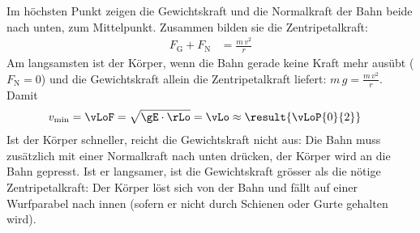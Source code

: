 \begin{center}
\end{center}

Im höchsten Punkt zeigen die Gewichtskraft und die Normalkraft der Bahn beide nach unten, zum Mittelpunkt. Zusammen bilden sie die Zentripetalkraft:
\begin{align}
 F_\mathrm{G} + F_\mathrm{N} &= \frac{m\,v^2}{r}
\end{align}
Am langsamsten ist der Körper, wenn die Bahn gerade keine Kraft mehr ausübt ($F_\mathrm{N} = 0$) und die Gewichtskraft allein die Zentripetalkraft liefert: $m\,g = \frac{m\,v^2}{r}$. Damit
\begin{align}
 v_\mathrm{min} &= \vLoF = \sqrt{\gE\cdot\rLo} = \vLo \approx \result{\vLoP{0}{2}}
\end{align}
Ist der Körper schneller, reicht die Gewichtskraft nicht aus: Die Bahn muss zusätzlich mit einer Normalkraft nach unten drücken, der Körper wird an die Bahn gepresst. Ist er langsamer, ist die Gewichtskraft grösser als die nötige Zentripetalkraft: Der Körper löst sich von der Bahn und fällt auf einer Wurfparabel nach innen (sofern er nicht durch Schienen oder Gurte gehalten wird).
